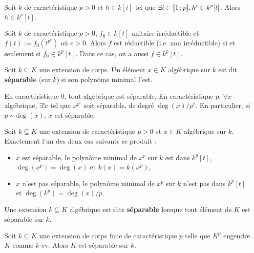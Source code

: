 	\begin{lem}
		Soit $k$ de caractéristique $p > 0$ et $h \in k[t]$ tel que $\exists i \in \mathopen{[\![}1\mathclose{}\mathpunct{};p\mathclose{]\!]}, h^i \in k^p[t]$.
		Alors $h \in k^p[t]$.
	\end{lem}
	
	\begin{pop}
		Soit $k$ de caractéristique $p > 0$, $f_0 \in k[t]$ unitaire irréductible et $f(t) := f_0(t^{p^e})$ où $e > 0$.
		Alors $f$ est réductible (i.e. non irréductible) si et seulement si $f_0 \in k^p[t]$.
		Dans ce cas, on a aussi $f \in k^p[t]$.
	\end{pop}
	
	\begin{defn}
		Soit $k \subseteq K$ une extension de corps.
		Un élément $x \in K$ algébrique sur $k$ est dit \textbf{séparable} (sur $k$) si son polynôme minimal l'est.
	\end{defn}
	
	\begin{rem}
		En caractéristique $0$, tout algébrique est séparable.
		En caractéristique $p$, $\forall x$ algébrique, $\exists ! e$ tel que $x^{p^e}$ soit séparable, de degré $\deg(x)/p^e$.
		En particulier, si $p \nmid \deg(x)$, $x$ est séparable.
	\end{rem}
	
	\begin{pop}
		Soit $k \subseteq K$ une extension de caractéristique $p > 0$ et $x \in K$ algébrique sur $k$.
		Exactement l'un des deux cas suivants se produit :
		\begin{itemize}
			\item[\textbullet] $x$ est séparable, le polynôme minimal de $x^p$ sur $k$ est dans $k^p[t]$, $\deg(x^p) = \deg(x)$ et $k(x) = k(x^p)$,
			\item[\textbullet] $x$ n'est pas séparable, le polynôme minimal de $x^p$ sur $k$ n'est pas dans $k^p[t]$ et $\deg(k^p) = \deg(x)/p$.
		\end{itemize}
	\end{pop}
	
	\begin{defn}
		Une extension $k \subseteq K$ algébrique est dite \textbf{séparable} lorsque tout élément de $K$ est séparable sur $k$.
	\end{defn}
	
	\begin{pop}
		Soit $k \subseteq K$ une extension de corps finie de caractéristique $p$ telle que $K^p$ engendre $K$ comme $k$-ev.
		Alors $K$ est séparable sur $k$.
	\end{pop}
	
